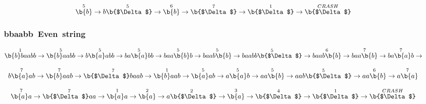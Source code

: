\documentclass[12pt]{article}
\begin{document}
\[
\overset{5}{\b{b}}\rightarrow
\overset{5}{b\b{$\Delta$}}\rightarrow
\overset{6}{\b{b}}\rightarrow
\overset{7}{\b{$\Delta$}}\rightarrow
\overset{1}{\b{$\Delta$}}\rightarrow
\overset{CRASH}{\b{$\Delta$}}
\]

\subsubsection{bbaabb~Even~string}

\[
\overset{1}{\b{b}baabb}\rightarrow
\overset{5}{\b{b}aabb}\rightarrow
\overset{5}{b\b{a}abb}\rightarrow
\overset{5}{ba\b{a}bb}\rightarrow
\overset{5}{baa\b{b}b}\rightarrow
\overset{5}{baab\b{b}}\rightarrow
\overset{5}{baabb\b{$\Delta$}}\rightarrow
\overset{6}{baab\b{b}}\rightarrow
\overset{7}{baa\b{b}}\rightarrow
\overset{7}{ba\b{a}b}\rightarrow
\]

\[
\overset{7}{b\b{a}ab}\rightarrow
\overset{7}{\b{b}aab}\rightarrow
\overset{7}{\b{$\Delta$}baab}\rightarrow
\overset{1}{\b{b}aab}\rightarrow
\overset{5}{\b{a}ab}\rightarrow
\overset{5}{a\b{a}b}\rightarrow
\overset{5}{aa\b{b}}\rightarrow
\overset{5}{aab\b{$\Delta$}}\rightarrow
\overset{6}{aa\b{b}}\rightarrow
\overset{7}{a\b{a}}
\]

\[
\overset{7}{\b{a}a}\rightarrow
\overset{7}{\b{$\Delta$}aa}\rightarrow
\overset{1}{\b{a}a}\rightarrow
\overset{2}{\b{a}}\rightarrow
\overset{2}{a\b{$\Delta$}}\rightarrow
\overset{3}{\b{a}}\rightarrow
\overset{4}{\b{$\Delta$}}\rightarrow
\overset{1}{\b{$\Delta$}}\rightarrow
\overset{CRASH}{\b{$\Delta$}}
\]
\end{document}

